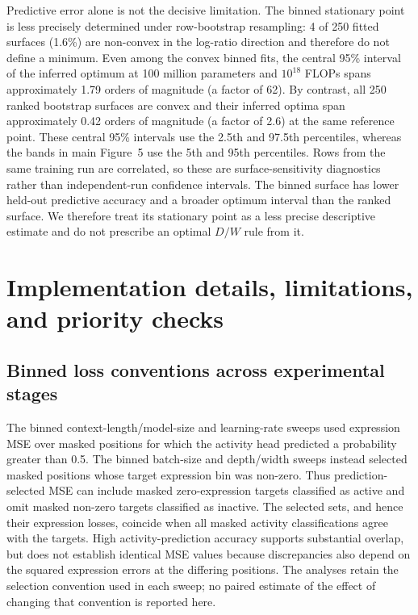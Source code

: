 \documentclass[11pt]{article}
\begin{document}
Predictive error alone is not the decisive limitation.
The binned stationary point is less precisely determined under row-bootstrap resampling: 4 of 250 fitted surfaces (1.6\%) are non-convex in the log-ratio direction and therefore do not define a minimum.
Even among the convex binned fits, the central 95\% interval of the inferred optimum at 100 million parameters and $10^{18}$ FLOPs spans approximately 1.79 orders of magnitude (a factor of 62).
By contrast, all 250 ranked bootstrap surfaces are convex and their inferred optima span approximately 0.42 orders of magnitude (a factor of 2.6) at the same reference point.
These central 95\% intervals use the 2.5th and 97.5th percentiles, whereas the bands in main Figure~5 use the 5th and 95th percentiles.
Rows from the same training run are correlated, so these are surface-sensitivity diagnostics rather than independent-run confidence intervals.
The binned surface has lower held-out predictive accuracy and a broader optimum interval than the ranked surface. We therefore treat its stationary point as a less precise descriptive estimate and do not prescribe an optimal $D/W$ rule from it.

\FloatBarrier
\section{Implementation details, limitations, and priority checks}
\label{sec:supp-limitations}

\subsection{Binned loss conventions across experimental stages}

The binned context-length/model-size and learning-rate sweeps used expression MSE over masked positions for which the activity head predicted a probability greater than 0.5.
The binned batch-size and depth/width sweeps instead selected masked positions whose target expression bin was non-zero.
Thus prediction-selected MSE can include masked zero-expression targets classified as active and omit masked non-zero targets classified as inactive.
The selected sets, and hence their expression losses, coincide when all masked activity classifications agree with the targets.
High activity-prediction accuracy supports substantial overlap, but does not establish identical MSE values because discrepancies also depend on the squared expression errors at the differing positions.
The analyses retain the selection convention used in each sweep; no paired estimate of the effect of changing that convention is reported here.
\end{document}
